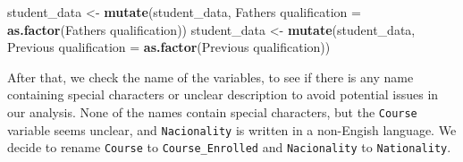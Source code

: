 \documentclass[
]{article}
\newenvironment{Shaded}{\begin{snugshade}}{\end{snugshade}}
\newcommand{\AttributeTok}[1]{\textcolor[rgb]{0.13,0.29,0.53}{#1}}
\newcommand{\FunctionTok}[1]{\textcolor[rgb]{0.13,0.29,0.53}{\textbf{#1}}}
\newcommand{\NormalTok}[1]{#1}
\newcommand{\OtherTok}[1]{\textcolor[rgb]{0.56,0.35,0.01}{#1}}
\newcommand{\StringTok}[1]{\textcolor[rgb]{0.31,0.60,0.02}{#1}}
\begin{document}
\begin{Shaded}
\begin{Highlighting}[]
\NormalTok{student\_data }\OtherTok{\textless{}{-}} \FunctionTok{mutate}\NormalTok{(student\_data, }\StringTok{\textasciigrave{}}\AttributeTok{Father\textquotesingle{}s qualification}\StringTok{\textasciigrave{}} \OtherTok{=} \FunctionTok{as.factor}\NormalTok{(}\StringTok{\textasciigrave{}}\AttributeTok{Father\textquotesingle{}s qualification}\StringTok{\textasciigrave{}}\NormalTok{))}
\NormalTok{student\_data }\OtherTok{\textless{}{-}} \FunctionTok{mutate}\NormalTok{(student\_data, }\StringTok{\textasciigrave{}}\AttributeTok{Previous qualification}\StringTok{\textasciigrave{}} \OtherTok{=} \FunctionTok{as.factor}\NormalTok{(}\StringTok{\textasciigrave{}}\AttributeTok{Previous qualification}\StringTok{\textasciigrave{}}\NormalTok{))}
\end{Highlighting}
\end{Shaded}

After that, we check the name of the variables, to see if there is any
name containing special characters or unclear description to avoid
potential issues in our analysis. None of the names contain special
characters, but the \texttt{Course} variable seems unclear, and
\texttt{Nacionality} is written in a non-Engish language. We decide to
rename \texttt{Course} to \texttt{Course\_Enrolled} and
\texttt{Nacionality} to \texttt{Nationality}.
\end{document}
